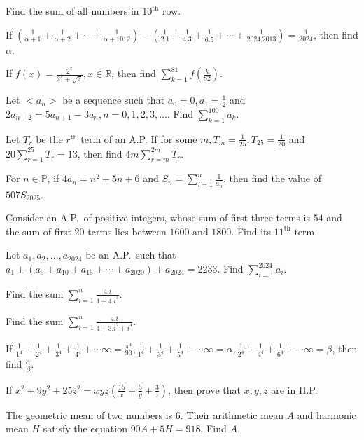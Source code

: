   Find the sum of all numbers in $10^{\mathrm{th}}$ row.
\item If $\left(\frac{1}{\alpha + 1} + \frac{1}{\alpha + 2} + \cdots + \frac{1}{\alpha + 1012}\right)
  - \left(\frac{1}{2.1} + \frac{1}{4.3} + \frac{1}{6.5} + \cdots + \frac{1}{2024.2013}\right)
  = \frac{1}{2024}$, then find $\alpha$.
\item If $f(x) = \frac{2^x}{2^x + \sqrt{2}}, x\in\mathbb{R}$, then find $\displaystyle\sum_{k =
  1}^{81}f\left(\frac{k}{82}\right)$.
\item Let $<a_n>$ be a sequence such that $a_0 = 0, a_1 = \frac{1}{2}$ and $2a_{n + 2} = 5a_{n + 1} - 3a_n,
  n = 0, 1, 2, 3, \ldots$. Find $\displaystyle\sum_{k = 1}^{100}a_k$.
\item Let $T_r$ be the $r^{\mathrm{th}}$ term of an A.P. If for some $m, T_m = \frac{1}{25}, T_{25}
  = \frac{1}{20}$ and $20\displaystyle\sum_{r = 1}^{25}T_r = 13$, then find $4m\displaystyle\sum_{r =
    m}^{2m}T_r$.
\item For $n\in\mathbb{P}$, if $4a_n = n^2 + 5n + 6$ and $S_n = \displaystyle\sum_{i = 1}^n\frac{1}{a_n}$,
  then find the value of $507S_{2025}$.
\item Consider an A.P.\ of positive integers, whose sum of first three terms is $54$ and the sum of first
  $20$ terms lies between $1600$ and $1800$. Find its $11^{\mathrm{th}}$ term.
\item Let $a_1, a_2, \ldots, a_{2024}$ be an A.P.\ such that $a_1 + (a_5 + a_{10} + a_{15} + \cdots +
  a_{2020}) + a_{2024} = 2233$. Find $\displaystyle\sum_{i = 1}^{2024}a_i$.
\item Find the sum $\displaystyle\sum_{i = 1}^n\frac{4.i}{1 + 4.i^4}$.
\item Find the sum $\displaystyle\sum_{i = 1}^n\frac{4.i}{4 + 3.i^2 + i^4}$.
\item If $\frac{1}{1^4} + \frac{1}{2^4} + \frac{1}{3^4} + \frac{1}{4^4} + \cdots \infty
  = \frac{\pi^4}{90}, \frac{1}{1^4} + \frac{1}{3^4} + \frac{1}{5^4} + \cdots \infty = \alpha, \frac{1}{2^4}
  + \frac{1}{4^4} + \frac{1}{6^4} + \cdots \infty = \beta$, then find $\frac{\alpha}{\beta}$.
\item If $x^2 + 9y^2 + 25z^2 = xyz\left(\frac{15}{x} + \frac{5}{y} + \frac{3}{z}\right)$, then prove that
  $x, y, z$ are in H.P.
\item The geometric mean of two numbers is $6$. Their arithmetic mean $A$ and harmonic mean $H$ satisfy the
  equation $90A + 5H = 918$. Find $A$.

